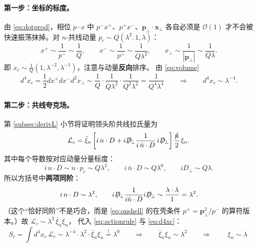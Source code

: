 \documentclass[UTF8,a4paper,11pt]{ctexart}
\theoremstyle{definition}
\theoremstyle{remark}
\theoremstyle{plain}
\newcommand{\nbsl}{\bar{n}\mkern-10.5mu/\mkern1.5mu}
\newcommand{\Dsl}{D\mkern-11.5mu/}
\newcommand{\pperp}{\bm{p}_\perp}
\begin{document}
\paragraph{第一步：坐标的标度。}
由 \eqref{eq:dotprod}，相位 $p\cdot x$ 中
$p^-x^+$、$p^+x^-$、$\pperp\!\cdot\!\bm x_\perp$ 各自必须是 $\mathcal O(1)$
才不会被快速振荡抹掉。对 $n$-共线动量 $p_c\sim Q(\lambda^2,1,\lambda)$：
\begin{equation}
  x^+\sim\frac{1}{p^-}\sim\frac1Q,
  \qquad
  x^-\sim\frac{1}{p^+}\sim\frac{1}{Q\lambda^2},
  \qquad
  x_\perp\sim\frac{1}{|\pperp|}\sim\frac{1}{Q\lambda} .
\end{equation}
即 $x_c\sim\frac1Q(1,\lambda^{-2},\lambda^{-1})$，注意与动量\textbf{反向}排序。
由 \eqref{eq:volume}
\begin{equation}
  d^4x_c=\frac12dx^+dx^-d^2x_\perp
  \sim\frac1Q\cdot\frac{1}{Q\lambda^2}\cdot\frac{1}{Q^2\lambda^2}
  =\frac{1}{Q^4\lambda^4}
  \qquad\Longrightarrow\qquad
  d^4x_c\sim\lambda^{-4} .
  \label{eq:d4xc}
\end{equation}

\paragraph{第二步：共线夸克场。}
第 \ref{subsec:derivL} 小节将证明领头阶共线拉氏量为
\begin{equation}
  \mathcal L_c=\bar\xi_n\left[i\,n\cdot D
  +i\Dsl_\perp\frac{1}{i\,\bar n\cdot D}\,i\Dsl_\perp\right]
  \frac{\nbsl}{2}\,\xi_n .
  \label{eq:Lcprev}
\end{equation}
其中每个导数按对应动量分量标度：
\begin{equation}
  i\,n\cdot D\sim n\cdot p_c\sim Q\lambda^2,
  \qquad
  i\,\bar n\cdot D\sim Q\lambda^0,
  \qquad
  iD_\perp\sim Q\lambda .
\end{equation}
所以方括号中\textbf{两项同阶}：
\begin{equation}
  i\,n\cdot D\sim\lambda^2,
  \qquad
  i\Dsl_\perp\frac{1}{i\bar n\cdot D}i\Dsl_\perp
  \sim\frac{\lambda\cdot\lambda}{1}=\lambda^2 .
  \label{eq:sameorder}
\end{equation}
（这个“恰好同阶”不是巧合，而是 \eqref{eq:onshell} 的在壳条件
$p^+=\pperp^2/p^-$ 的算符版本。）故 $\mathcal L_c\sim\lambda^2\,\bar\xi_n\xi_n$，
代入 \eqref{eq:actionrule} 与 \eqref{eq:d4xc}：
\begin{equation}
  S_c=\int\! d^4x_c\,\mathcal L_c
  \sim\lambda^{-4}\cdot\lambda^2\cdot\bar\xi_n\xi_n
  \stackrel{!}{=}\lambda^0
  \qquad\Longrightarrow\qquad
  \bar\xi_n\xi_n\sim\lambda^2
  \qquad\Longrightarrow\qquad
  \boxed{\;\xi_n\sim\lambda\;}
  \label{eq:xiscaling}
\end{equation}
\end{document}
